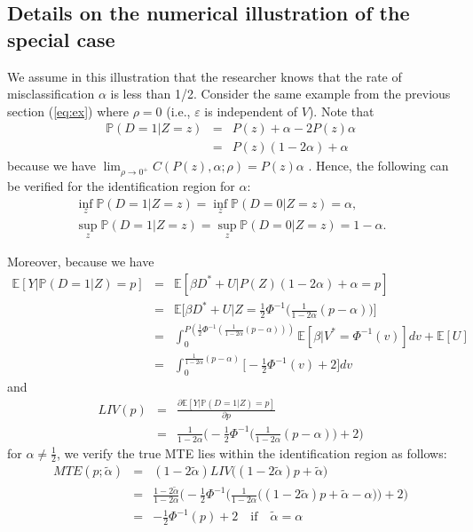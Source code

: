 \documentclass[11pt,reqno]{amsart}
\theoremstyle{plain}
\numberwithin{equation}{section}
\begin{document}
\subsection{Details on the numerical illustration of the special case} \label{numeric2:apx}
We assume in this illustration that the researcher knows that the rate of misclassification $\alpha$ is less than 1/2.
Consider the same example from the previous section (\ref{eq:ex}) where $\rho=0$ (i.e., $\varepsilon$ is independent of $V$). 
Note that
\begin{eqnarray*}
    \mathbb P(D=1\vert Z=z) &=& P(z) + \alpha - 2P(z)\alpha
    \\
    &=& P(z)(1-2\alpha) + \alpha
\end{eqnarray*}
because we have $\lim_{\rho \to 0^+} C(P(z), \alpha; \rho) = P(z)\alpha$ \citep{meyer2013bivariate}.
Hence, the following can be verified for the identification region for $\alpha$:
\begin{eqnarray*}
    \inf_z \mathbb P(D=1\vert Z=z) = \inf_z \mathbb P(D=0\vert Z=z)
    = \alpha,\\
    \sup_z \mathbb P(D=1\vert Z=z) = \sup_z \mathbb P(D=0\vert Z=z)
    =1-\alpha.
\end{eqnarray*}

Moreover, because we have 
\begin{eqnarray*}
    \mathbb E[Y \vert \mathbb P(D=1 \vert Z)=p] &=& \mathbb E[\beta D^* + U \vert P(Z)(1-2\alpha) + \alpha=p] \\
    &=& \mathbb E\bigg[\beta D^* + U \Big\vert Z = \frac{1}{2} \Phi ^{-1} \Big( \frac{1}{1-2\alpha}(p-\alpha)\Big)\bigg] \\
    &=& \int_{0}^{P(\frac{1}{2} \Phi ^{-1} ( \frac{1}{1-2\alpha}(p-\alpha)))} \mathbb E [\beta \vert V^* = \Phi ^{-1}(v) ]dv + \mathbb E[U] \\
    &=& \int_{0}^{\frac{1}{1-2\alpha}(p-\alpha)} \bigg[ -\frac{1}{2} \Phi ^{-1}(v)+2 \bigg] dv
\end{eqnarray*}
and 
\begin{eqnarray*}
    LIV(p) &=& \frac{\partial \mathbb E[Y \vert \mathbb P(D=1 \vert Z)=p]}{\partial p} \\
    &=& \frac{1}{1-2\alpha}\bigg( -\frac{1}{2} \Phi ^{-1} \Big( \frac{1}{1-2\alpha}(p-\alpha)\Big) + 2 \bigg)
\end{eqnarray*}
for $\alpha \neq \frac{1}{2}$, we verify the true MTE lies within the identification region as follows:
\begin{eqnarray*}
    MTE(p;\tilde{\alpha})&=& (1-2\tilde{\alpha}) LIV \big( (1-2\tilde{\alpha})p + \tilde{\alpha} \big) \\
    &=& \frac{1-2\tilde{\alpha}}{1-2\alpha}\bigg( -\frac{1}{2} \Phi ^{-1} \Big( \frac{1}{1-2\alpha}\big( (1-2\tilde{\alpha})p + \tilde{\alpha} -\alpha \big)\Big) + 2 \bigg) \\
    &=& - \frac{1}{2}\Phi ^{-1}(p) + 2 \quad \textrm{if} \quad \tilde{\alpha} = \alpha
\end{eqnarray*}

\clearpage


\end{document}
